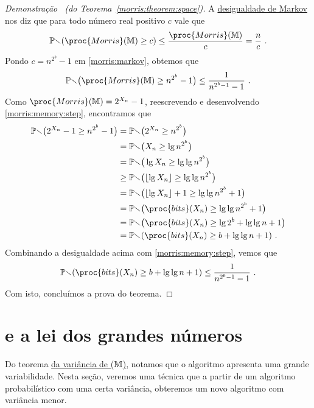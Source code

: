 \begin{proof}[Demonstração \ (do Teorema~\ref{morris:theorem:space})]
  A \hyperref[ap:markov]{desigualdade de Markov} nos diz que para todo número real positivo $c$ vale que
  \begin{align}
    \Pbb(\proc{Morris}(\Mbb) \geq c) \leq \frac{\proc{Morris}(\Mbb)}{c} = \frac{n}{c} \ . \label{morris:markov}
  \end{align}
  Pondo $c = n^{2^b} - 1$ em \eqref{morris:markov}, obtemos que
  \begin{align}
    \Pbb\big(\proc{Morris}(\Mbb) \geq n^{2^b} - 1\big) \leq \frac{1}{n^{2^b-1} - 1} \ . \label{morris:memory:step}
  \end{align}
  Como $\proc{Morris}(\Mbb) = 2^{X_n} - 1$, reescrevendo e desenvolvendo \eqref{morris:memory:step}, encontramos que
  \begin{align*}
    \Pbb\big(2^{X_n} - 1 \geq n^{2^b} - 1\big)
    &=  \Pbb\big(2^{X_n} \geq n^{2^b}\big) \\
    &=  \Pbb\big(X_n \geq \lg n^{2^b}\big) \\
    &=  \Pbb\big(\lg X_n \geq \lg \lg n^{2^b}\big) \\
    &\geq  \Pbb\big(\lfloor\lg X_n\rfloor \geq \lg \lg n^{2^b}\big) \\
    &=  \Pbb\big(\lfloor\lg X_n\rfloor + 1 \geq \lg \lg n^{2^b} + 1\big) \\
    &=  \Pbb\big(\proc{bits}(X_n) \geq \lg \lg n^{2^b} + 1\big) \\
    &=  \Pbb\big(\proc{bits}(X_n) \geq \lg 2^{b} + \lg \lg n + 1\big) \\
    &=  \Pbb(\proc{bits}(X_n) \geq b + \lg \lg n + 1) \ .
  \end{align*}
  Combinando a desigualdade acima com \eqref{morris:memory:step}, vemos que
  \[  \Pbb(\proc{bits}(X_n) \geq b + \lg \lg n + 1) \leq \frac{1}{n^{2^b-1} - 1} \ . \]
  Com isto, concluímos a prova do teorema.
\end{proof}

\section{ e a lei dos grandes números}
\label{sec:morris:plus}

Do teorema \hyperref[morris:theorem:variance]{da variância de ($\mathbb{M}$)}, notamos que o algoritmo apresenta
uma grande variabilidade. Nesta seção, veremos uma técnica que a partir de um algoritmo probabilístico com uma certa 
variância, obteremos um novo algoritmo com variância menor.

